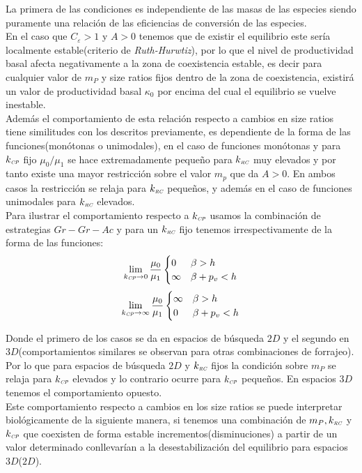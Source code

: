 La primera de las condiciones es independiente de las masas de las especies siendo puramente una relaci\'on de las eficiencias de conversi\'on de las especies. \\
En el caso que $C_\varepsilon > 1 $ y $ A  > 0$ tenemos que de existir el equilibrio este ser\'ia localmente estable(criterio de \emph{Ruth-Hurwtiz}), por lo que el nivel de productividad basal afecta negativamente a la zona de coexistencia estable, es decir para cualquier valor de $m_P$ y size ratios fijos dentro de la zona de coexistencia, existir\'a un valor de productividad basal $\kappa_0$ por encima del cual el equilibrio se vuelve inestable.\\
Adem\'as el comportamiento de esta relaci\'on respecto a cambios en size ratios tiene similitudes con los descritos previamente, es dependiente de la forma de las funciones(mon\'otonas o unimodales), en el caso de funciones mon\'otonas y para $k_{\textit{\tiny CP}}$ fijo $\mu_0/\mu_1$ se hace extremadamente peque\~no para $k_{\textit{\tiny RC}}$ muy elevados y por tanto existe una mayor restricci\'on sobre el valor $m_p$ que da $A>0$. En ambos casos la restricci\'on se relaja para $k_{\textit{\tiny RC}}$ peque\~nos, y adem\'as en el caso de funciones unimodales para $k_{\textit{\tiny RC}}$ elevados.\\
Para ilustrar el comportamiento respecto a $k_{\textit{\tiny CP}}$ usamos la combinaci\'on de estrategias $Gr-Gr-Ac$ y para un $k_{\textit{\tiny RC}}$ fijo tenemos irrespectivamente de la forma de las funciones:
\begin{equation}
      \lim_{k_{\textit{\tiny CP}} \to 0} \frac{\mu_0}{\mu_1} 
  \begin{cases}
     0 & \beta > h \\
     \infty & \beta + p_v < h\\ 
  \end{cases}
\end{equation}
\begin{equation}
  \lim_{k_{\textit{\tiny CP}} \to \infty} \frac{\mu_0}{\mu_1}
  \begin{cases}
    \infty & \beta > h\\ 
    0 & \beta + p_v < h\\
    \end{cases}
\end{equation}

Donde el primero de los casos se da en espacios de b\'usqueda $2D$ y el segundo en $3D$(comportamientos similares se observan para otras combinaciones de forrajeo). Por lo que para espacios de b\'usqueda $2D$ y $k_{\textit{\tiny RC}}$ fijos la condici\'on sobre $m_P$ se relaja para $k_{\textit{\tiny CP}}$ elevados y lo contrario ocurre para $k_{\textit{\tiny CP}}$ peque\~nos. En espacios $3D$ tenemos el comportamiento opuesto.\\
Este comportamiento respecto a cambios en los size ratios se puede interpretar biol\'ogicamente de la siguiente manera, si tenemos una combinaci\'on de $m_P,k_{\textit{\tiny RC}}$ y $k_{\textit{\tiny CP}}$ que coexisten de forma estable incrementos(disminuciones) a partir de un valor determinado conllevar\'ian a la desestabilizaci\'on del equilibrio para espacios $3D$($2D$).\\

